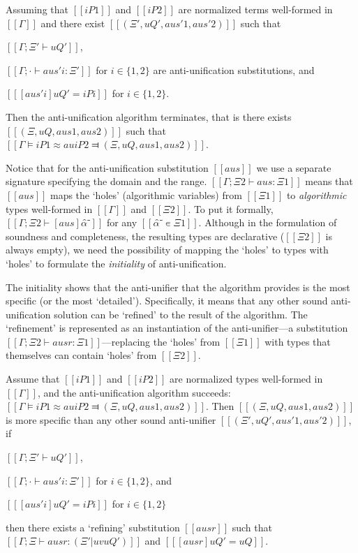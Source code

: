 \begin{lemma*}
    \label{lemma:au-completeness}
    Assuming that $[[iP1]]$ and $[[iP2]]$ are normalized terms well-formed in $[[Γ]]$
    and there exist  $[[(Ξ', uQ', aus'1, aus'2)]]$ such that
    \begin{enumerate*}
        \item $[[Γ ; Ξ' ⊢ uQ']]$,
        \item $[[Γ ; · ⊢ aus'i : Ξ']]$ for $i \in \{1,2\}$ 
        are anti-unification substitutions, and
        \item $[[ [aus'i] uQ' = iPi ]]$ for $i \in \{1,2\}$.
    \end{enumerate*}

    Then the anti-unification algorithm terminates, that is there exists
    $[[(Ξ, uQ, aus1, aus2)]]$ such that $[[Γ ⊨ iP1 ≈au iP2 ⫤ (Ξ, uQ, aus1, aus2)]]$.
\end{lemma*}

Notice that for the anti-unification substitution $[[aus]]$ we use a separate
signature specifying the domain and the range. $[[Γ ; Ξ2 ⊢ aus : Ξ1]]$ means
that $[[aus]]$ maps the `holes' (\ie algorithmic variables) from $[[Ξ1]]$
to \emph{algorithmic} types well-formed in $[[Γ]]$ and $[[Ξ2]]$. To put it
formally, $[[Γ ; Ξ2 ⊢ [aus]α̂⁻]]$ for any $[[α̂⁻ ∊ Ξ1]]$.
Although in the formulation of soundness and completeness, the resulting types are declarative
(\ie $[[Ξ2]]$ is always empty), we need the possibility of mapping the
`holes' to types with `holes' to formulate the \emph{initiality} of
anti-unification.

The initiality shows that the anti-unifier that the algorithm provides is the
most specific (or the most `detailed'). Specifically, it means that any other
sound anti-unification solution can be `refined' to the result of the algorithm.  
The `refinement' is represented as an instantiation of the anti-unifier---a 
substitution $[[Γ ; Ξ2 ⊢ ausr : Ξ1]]$---replacing the `holes' from $[[Ξ1]]$ with
types that themselves can contain `holes' from $[[Ξ2]]$.

\begin{lemma*}
        Assume that $[[iP1]]$ and $[[iP2]]$ are normalized types well-formed in $[[Γ]]$, 
        and the anti-unification algorithm succeeds: $[[Γ ⊨ iP1 ≈au iP2 ⫤ (Ξ, uQ, aus1, aus2)]]$. 
        Then $[[(Ξ, uQ, aus1, aus2)]]$ is more specific than
        any other sound anti-unifier $[[(Ξ', uQ', aus'1, aus'2)]]$, \ie if
        \begin{enumerate*}
            \item $[[Γ ; Ξ' ⊢ uQ']]$,
            \item $[[Γ ; · ⊢ aus'i : Ξ']]$ for $i \in \{1,2\}$, and
            \item $[[ [aus'i] uQ' = iPi ]]$ for $i \in \{1,2\}$
        \end{enumerate*}
        then there exists a `refining' substitution $[[ausr]]$ such that
        $[[Γ ; Ξ ⊢ ausr : (Ξ' | uv uQ')]]$ and $[[ [ausr] uQ' = uQ ]]$. 
\end{lemma*}

